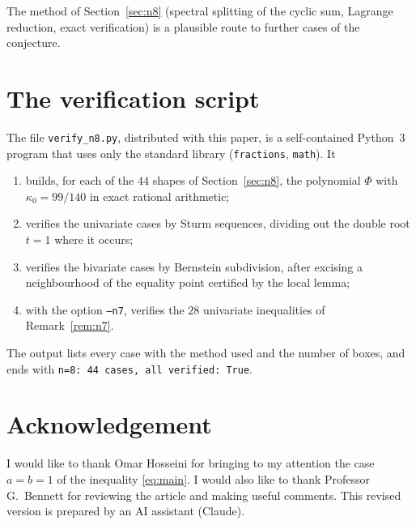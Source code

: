 \documentclass[11pt]{article}
\theoremstyle{remark}
\numberwithin{equation}{section}
\begin{document}
The method of Section~\ref{sec:n8} (spectral splitting of the cyclic sum, Lagrange reduction,
exact verification) is a plausible route to further cases of the conjecture.

\appendix
\section{The verification script}\label{app:code}

The file \texttt{verify\_n8.py}, distributed with this paper, is a self-contained Python~3 program
that uses only the standard library (\texttt{fractions}, \texttt{math}). It
\begin{enumerate}[label=(\arabic*)]
\item builds, for each of the $44$ shapes of Section~\ref{sec:n8}, the polynomial $\Phi$ with
$\kappa_0=99/140$ in exact rational arithmetic;
\item verifies the univariate cases by Sturm sequences, dividing out the double root $t=1$
where it occurs;
\item verifies the bivariate cases by Bernstein subdivision, after excising a neighbourhood of the
equality point certified by the local lemma;
\item with the option \texttt{--n7}, verifies the $28$ univariate inequalities of
Remark~\ref{rem:n7}.
\end{enumerate}
The output lists every case with the method used and the number of boxes, and ends with
\texttt{n=8: 44 cases, all verified: True}.

\section*{Acknowledgement}
I would like to thank Omar Hosseini for bringing to my attention the case $a=b=1$ of the
inequality \eqref{eq:main}. I would also like to thank Professor G.~Bennett for reviewing the
article and making useful comments. This revised version is prepared by an AI assistant (Claude). 
\end{document}
